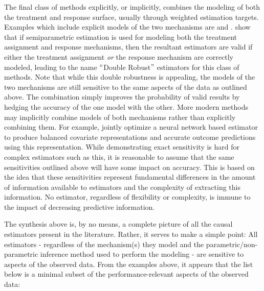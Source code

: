 \documentclass[../main.tex]{subfiles}
\begin{document}
\vspace{\baselineskip}
The final class of methods explicitly, or implicitly, combines the modeling of both the treatment and response surface, usually through weighted estimation targets. Examples which include explicit models of the two mechanisms are \textcite{Rubin2000CombiningCovariates} and \textcite{Robins1995SemiparametricData}. \textcite{Scharfstein1999AdjustingRejoinder} show that if semiparametric estimation is used for modeling both the treatment assignment and response mechanisms, then the resultant estimators are valid if either the treatment assignment \textit{or }the response mechanism are correctly modeled, leading to the name $``$Double Robust$"$  estimators for this class of methods. Note that while this double robustness is appealing, the models of the two mechanisms are still sensitive to the same aspects of the data as outlined above. The combination simply improves the probability of valid results by hedging the accuracy of the one model with the other. More modern methods may implicitly combine models of both mechanisms rather than explicitly combining them. For example, \textcite{Johansson2016LearningInference} jointly optimize a neural network based estimator to produce balanced covariate representations and accurate outcome predictions using this representation. While demonstrating exact sensitivity is hard for complex estimators such as this, it is reasonable to assume that the same sensitivities outlined above will have some impact on accuracy. This is based on the idea that these sensitivities represent fundamental differences in the amount of information available to estimators and the complexity of extracting this information. No estimator, regardless of flexibility or complexity, is immune to the impact of decreasing predictive information.\par


\vspace{\baselineskip}
The synthesis above is, by no means, a complete picture of all the causal estimators present in the literature. Rather, it serves to make a simple point: All estimators - regardless of the mechanism(s) they model and the parametric/non-parametric inference method used to perform the modeling - are sensitive to aspects of the observed data. From the examples above, it appears that the list below is a minimal subset of the performance-relevant aspects of the observed data:\par
\end{document}
